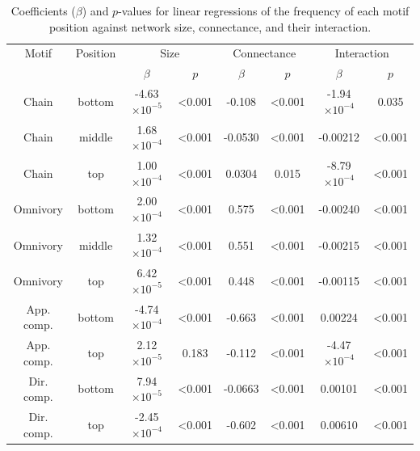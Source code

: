 \documentclass[12pt]{article}
\begin{document}
\begin{spacing}{2.0}
    
            \begin{table}[h!]
                \caption{Coefficients ($\beta$) and $p$-values for linear regressions of the frequency of each motif position against network size, connectance, and their interaction.}
                \label{SC_tab}
                \footnotesize
                \begin{tabular}{c c | c c | cc | cc |}
                Motif & Position & \multicolumn{2}{c}{Size} & \multicolumn{2}{c}{Connectance} & \multicolumn{2}{c}{Interaction} \\
                & & $\beta$ & $p$ & $\beta$ & $p$ & $\beta$ & $p$ \\
                \hline
                Chain & bottom & -4.63$\times10^{-5}$ & \textless0.001 & -0.108 & \textless0.001 & -1.94$\times10^{-4}$ & 0.035 \\
                Chain & middle & 1.68$\times10^{-4}$ & \textless0.001 & -0.0530 & \textless0.001 & -0.00212 & \textless0.001 \\
                Chain & top & 1.00$\times10^{-4}$ & \textless0.001 & 0.0304 & 0.015 & -8.79$\times10^{-4}$ & \textless0.001 \\
                \hline
                Omnivory & bottom & 2.00$\times10^{-4}$ & \textless0.001 & 0.575 & \textless0.001 & -0.00240 & \textless0.001 \\
                Omnivory & middle & 1.32$\times10^{-4}$ & \textless0.001 & 0.551 & \textless0.001 & -0.00215 & \textless0.001 \\
                Omnivory & top & 6.42$\times10^{-5}$ & \textless0.001 & 0.448 & \textless0.001 & -0.00115 & \textless0.001 \\
                \hline
                App. comp. & bottom & -4.74$\times10^{-4}$ & \textless0.001 & -0.663 & \textless0.001 & 0.00224 & \textless0.001 \\
                App. comp. & top & 2.12$\times10^{-5}$ & 0.183 & -0.112 & \textless0.001 & -4.47$\times10^{-4}$ & \textless0.001 \\
                \hline
                Dir. comp. & bottom & 7.94$\times10^{-5}$ & \textless0.001 & -0.0663 & \textless0.001 & 0.00101 & \textless0.001 \\
                Dir. comp. & top & -2.45$\times10^{-4}$ & \textless0.001 & -0.602 & \textless0.001 & 0.00610 & \textless0.001 \\
                \hline
                \end{tabular}
                \end{table}
    

\end{spacing}
\end{document}
